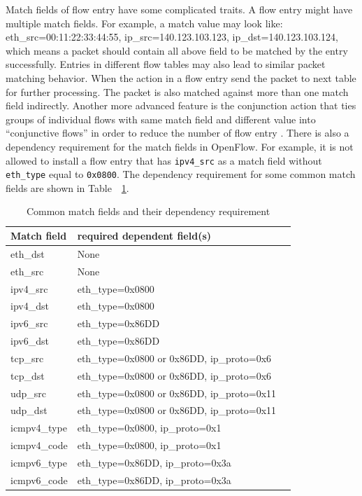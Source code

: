 Match fields of flow entry have some complicated traits. A flow entry might have multiple match fields. For example, a match value may look like: eth\_src=00:11:22:33:44:55, ip\_src=140.123.103.123, ip\_dst=140.123.103.124, which means a packet should contain all above field to be matched by the entry successfully. Entries in different flow tables may also lead to similar packet matching behavior. When the action in a flow entry send the packet to next table for further processing. The packet is also matched against more than one match field indirectly. Another more advanced feature is the conjunction action that ties groups of individual flows with same match field and different value into ``conjunctive flows'' in order to reduce the number of flow entry \cite{OVS_OFCTL}. There is also a dependency requirement for the match fields in OpenFlow. For example, it is not allowed to install a flow entry that has \texttt{ipv4\_src} as a match field without \texttt{eth\_type} equal to \texttt{0x0800}. The dependency requirement for some common match fields are shown in Table~~\ref{table:match_fields_dependency}.

\begin{table}[H]
\centering
\caption{Common match fields and their dependency requirement}
\begin{tabular}{|l|p{4cm}|p{8cm}}
\hline Match field & required dependent field(s) \\
\hline eth\_dst & None \\
\hline eth\_src & None \\
\hline ipv4\_src & eth\_type=0x0800 \\
\hline ipv4\_dst & eth\_type=0x0800 \\
\hline ipv6\_src & eth\_type=0x86DD \\
\hline ipv6\_dst & eth\_type=0x86DD \\
\hline tcp\_src & eth\_type=0x0800 or 0x86DD, ip\_proto=0x6 \\
\hline tcp\_dst & eth\_type=0x0800 or 0x86DD, ip\_proto=0x6 \\
\hline udp\_src & eth\_type=0x0800 or 0x86DD, ip\_proto=0x11 \\
\hline udp\_dst & eth\_type=0x0800 or 0x86DD, ip\_proto=0x11 \\
\hline icmpv4\_type & eth\_type=0x0800, ip\_proto=0x1 \\
\hline icmpv4\_code & eth\_type=0x0800, ip\_proto=0x1 \\
\hline icmpv6\_type & eth\_type=0x86DD, ip\_proto=0x3a \\
\hline icmpv6\_code & eth\_type=0x86DD, ip\_proto=0x3a \\
\hline
\end{tabular}
\label{table:match_fields_dependency}
\end{table}

